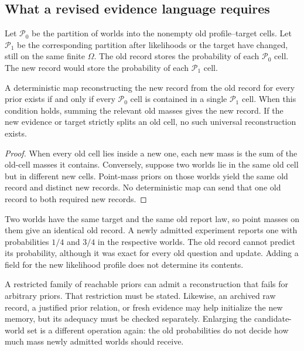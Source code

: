 \subsection{What a revised evidence language requires}
Let $\mathcal P_0$ be the partition of worlds into the nonempty old profile--target cells. Let $\mathcal P_1$ be the corresponding partition after likelihoods or the target have changed, still on the same finite $\Omega$. The old record stores the probability of each $\mathcal P_0$ cell. The new record would store the probability of each $\mathcal P_1$ cell.

\begin{GAcorollary}\label{GA:cor:memorymigration}
A deterministic map reconstructing the new record from the old record for every prior exists if and only if every $\mathcal P_0$ cell is contained in a single $\mathcal P_1$ cell. When this condition holds, summing the relevant old masses gives the new record. If the new evidence or target strictly splits an old cell, no such universal reconstruction exists.
\end{GAcorollary}
\begin{proof}
When every old cell lies inside a new one, each new mass is the sum of the old-cell masses it contains. Conversely, suppose two worlds lie in the same old cell but in different new cells. Point-mass priors on those worlds yield the same old record and distinct new records. No deterministic map can send that one old record to both required new records.
\end{proof}

\begin{GAcounterexample}\label{GA:ce:memorymigration}
Two worlds have the same target and the same old report law, so point masses on them give an identical old record. A newly admitted experiment reports one with probabilities $1/4$ and $3/4$ in the respective worlds. The old record cannot predict its probability, although it was exact for every old question and update. Adding a field for the new likelihood profile does not determine its contents.
\end{GAcounterexample}

A restricted family of reachable priors can admit a reconstruction that fails for arbitrary priors. That restriction must be stated. Likewise, an archived raw record, a justified prior relation, or fresh evidence may help initialize the new memory, but its adequacy must be checked separately. Enlarging the candidate-world set is a different operation again: the old probabilities do not decide how much mass newly admitted worlds should receive.

